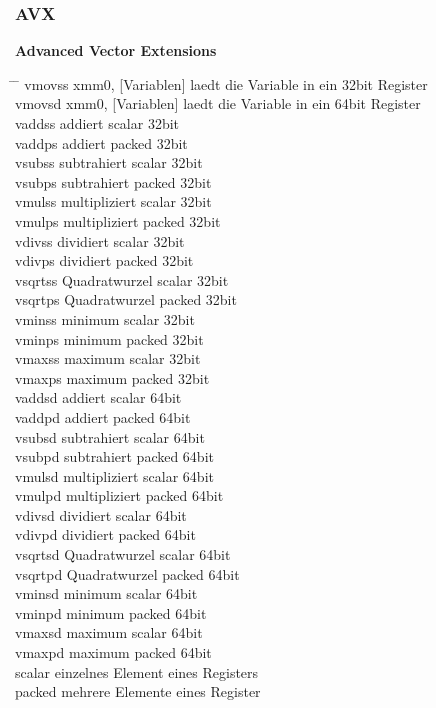 \documentclass[a4paper,12pt,twoside]{article}
\begin{document}
\subsubsection{AVX}
\textbf{Advanced Vector Extensions}
\begin{tabbing}
  \hspace{2mm} \= \hspace{50mm} \= \kill
  \> vmovss xmm0, [Variablen] \>  laedt die Variable in ein 32bit Register \\ 
  \> vmovsd xmm0, [Variablen] \> laedt die Variable in ein 64bit Register \\ 
  \> vaddss \> addiert scalar 32bit \\ 
  \> vaddps \> addiert packed 32bit \\ 
  \> vsubss \> subtrahiert scalar 32bit \\ 
  \> vsubps \> subtrahiert packed 32bit \\ 
  \> vmulss \> multipliziert scalar 32bit \\ 
  \> vmulps \> multipliziert packed 32bit \\ 
  \> vdivss \> dividiert scalar 32bit \\ 
  \> vdivps \> dividiert packed 32bit \\ 
  \> vsqrtss \> Quadratwurzel scalar 32bit \\ 
  \> vsqrtps \> Quadratwurzel packed 32bit \\ 
  \> vminss \> minimum scalar 32bit \\ 
  \> vminps \> minimum packed 32bit \\ 
  \> vmaxss \> maximum scalar 32bit \\ 
  \> vmaxps \> maximum packed 32bit \\ 
  \> vaddsd \> addiert scalar 64bit \\ 
  \> vaddpd \> addiert packed 64bit \\ 
  \> vsubsd \> subtrahiert scalar 64bit \\ 
  \> vsubpd \> subtrahiert packed 64bit \\ 
  \> vmulsd \> multipliziert scalar 64bit \\ 
  \> vmulpd \> multipliziert packed 64bit \\ 
  \> vdivsd \> dividiert scalar 64bit \\ 
  \> vdivpd \> dividiert packed 64bit \\ 
  \> vsqrtsd \> Quadratwurzel scalar 64bit \\ 
  \> vsqrtpd \> Quadratwurzel packed 64bit \\ 
  \> vminsd \> minimum scalar 64bit \\ 
  \> vminpd \> minimum packed 64bit \\ 
  \> vmaxsd \> maximum scalar 64bit \\ 
  \> vmaxpd \> maximum packed 64bit \\ 
  \> scalar \> einzelnes Element eines Registers \\ 
  \> packed \> mehrere Elemente eines Register \\ 
\end{tabbing}
\end{document}
